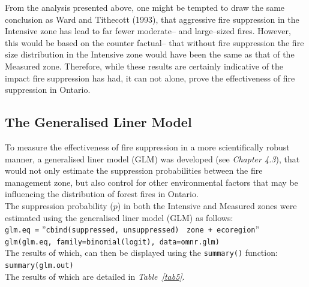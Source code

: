 \begin{spacing}{1.5}
\noindent From the analysis presented above, one might be tempted to draw the same conclusion as Ward and Tithecott (1993), that aggressive fire suppression in the Intensive zone has lead to far fewer moderate-- and large--sized fires. However, this would be based on the counter factual-- that without fire suppression the fire size distribution in the Intensive zone would have been the same as that of the Measured zone. Therefore, while these results are certainly indicative of the impact fire suppression has had, it can not alone, prove the effectiveness of fire suppression in Ontario.

\subsection{The Generalised Liner Model}

To measure the effectiveness of fire suppression in a more scientifically robust manner, a generalised liner model (GLM) was developed (see \emph{Chapter 4.3}), that would not only estimate the suppression probabilities between the fire management zone, but also control for other environmental factors that may be influencing the distribution of forest fires in Ontario. \\

\noindent The suppression probability ($p$) in both the Intensive and Measured zones were estimated using the generalised liner model (GLM) as follows: \\

\texttt{glm.eq =} ''\texttt{cbind(suppressed, unsuppressed)} $~$ \texttt{zone + ecoregion}'' \\

\texttt{glm(glm.eq, family=binomial(logit), data=omnr.glm) }\\

\noindent The results of which, can then be displayed using the \texttt{summary()} function: \\

\noindent \texttt{summary(glm.out)} \\

\noindent The results of which are detailed in \emph{Table~\ref{tab5}}. \\



\end{spacing}
